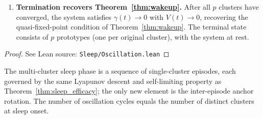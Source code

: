 \begin{theorem}
\begin{enumerate}
\item \textbf{Termination recovers Theorem~\ref{thm:wakeup}.}  After all $p$ clusters have converged, the system satisfies $\gamma(t) \to 0$ with $V(t) \to 0$, recovering the quasi-fixed-point condition of Theorem~\ref{thm:wakeup}.  The terminal state consists of $p$ prototypes (one per original cluster), with the system at rest.
\end{enumerate}
\end{theorem}

\begin{proof}
\leanok
{}
See Lean source: \texttt{Sleep/Oscillation.lean}
\end{proof}

\begin{remark}
\label{rem:oscillation_episodes}
\leanok
{}
The multi-cluster sleep phase is a sequence of single-cluster episodes, each governed by the same Lyapunov descent and self-limiting property as Theorem~\ref{thm:sleep_efficacy}; the only new element is the inter-episode anchor rotation.  The number of oscillation cycles equals the number of distinct clusters at sleep onset.
\end{remark}

